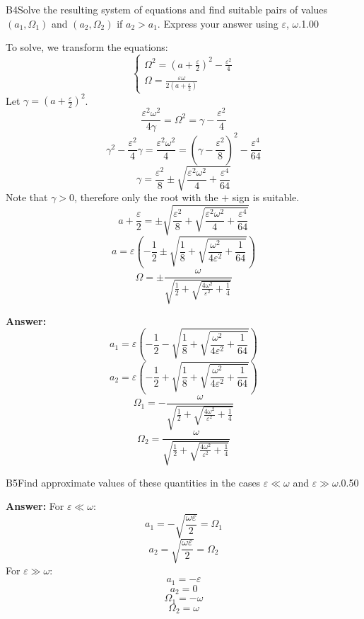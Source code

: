 \documentclass[11pt,a4paper]{article}
\begin{document}
\begin{solcard}{B4}{Solve the resulting system of equations and find suitable pairs of values $(a_1, \Omega_1)$ and $(a_2, \Omega_2)$ if $a_2>a_1$. Express your answer using $\varepsilon$, $\omega$.}{1.00}

To solve, we transform the equations: $$\begin{cases} \Omega^2 = \left(a+\frac{\varepsilon}{2}\right)^2 - \frac{\varepsilon^2}{4}\\ \Omega = \frac{\varepsilon\omega}{2\left(a+\frac{\varepsilon}{2}\right)} \end{cases}$$Let $\gamma = \left(a+\frac{\varepsilon}{2}\right)^2$. $$\frac{\varepsilon^2\omega^2}{4\gamma} = \Omega^2=\gamma-\frac{\varepsilon^2}{4}$$$$\gamma^2-\frac{\varepsilon^2}{4}\gamma=\frac{\varepsilon^2\omega^2}{4} = \left(\gamma - \frac{\varepsilon^2}{8}\right)^2 - \frac{\varepsilon^4}{64}$$$$\gamma = \frac{\varepsilon^2}{8} \pm \sqrt{\frac{\varepsilon^2\omega^2}{4}+\frac{\varepsilon^4}{64}}$$Note that $\gamma>0$, therefore only the root with the $+$ sign is suitable. $$a+\frac{\varepsilon}{2} = \pm \sqrt{\frac{\varepsilon^2}{8} + \sqrt{\frac{\varepsilon^2\omega^2}{4}+\frac{\varepsilon^4}{64}}}$$$$a = \varepsilon\left(-\frac{1}{2}\pm\sqrt{\frac{1}{8} + \sqrt{\frac{\omega^2}{4\varepsilon^2}+\frac{1}{64}}}\right)$$$$\Omega = \pm\frac{\omega}{\sqrt{\frac{1}{2} + \sqrt{\frac{4\omega^2}{\varepsilon^2}+\frac{1}{4}}}}$$

\par\smallskip\noindent\textbf{Answer:} $$a_1 = \varepsilon\left(-\frac{1}{2}-\sqrt{\frac{1}{8} + \sqrt{\frac{\omega^2}{4\varepsilon^2}+\frac{1}{64}}}\right)$$$$a_2 = \varepsilon\left(-\frac{1}{2}+\sqrt{\frac{1}{8} + \sqrt{\frac{\omega^2}{4\varepsilon^2}+\frac{1}{64}}}\right)$$$$\Omega_1 = -\frac{\omega}{\sqrt{\frac{1}{2} + \sqrt{\frac{4\omega^2}{\varepsilon^2}+\frac{1}{4}}}}$$$$\Omega_2 = \frac{\omega}{\sqrt{\frac{1}{2} + \sqrt{\frac{4\omega^2}{\varepsilon^2}+\frac{1}{4}}}}$$
\end{solcard}

\begin{solcard}{B5}{Find approximate values of these quantities in the cases $\varepsilon \ll \omega$ and $\varepsilon \gg \omega$.}{0.50}
\par\smallskip\noindent\textbf{Answer:} For $\varepsilon \ll \omega$: $$a_1 = -\sqrt{\frac{\omega\varepsilon}{2}}=\Omega_1$$$$a_2 = \sqrt{\frac{\omega\varepsilon}{2}}=\Omega_2$$For $\varepsilon \gg \omega$: $$a_1 = -\varepsilon$$$$a_2 = 0$$$$\Omega_1 = -\omega$$$$\Omega_2 = \omega$$
\end{solcard}
\end{document}
